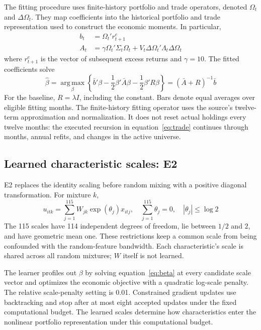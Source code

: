 \documentclass[12pt,letterpaper,fleqn]{article}
\newcommand{\argmax}{\operatorname*{arg\,max}}
\begin{document}
The fitting procedure uses finite-history portfolio and trade operators, denoted $\Omega_t$ and $\Delta\Omega_t$. They map coefficients into the historical portfolio and trade representation used to construct the economic moments. In particular,
\begin{align}
 b_t&=\Omega_t'r^e_{t+1}\\
 A_t&=\gamma\Omega_t'\Sigma_t\Omega_t
       +V_t\Delta\Omega_t'\Lambda_t\Delta\Omega_t\label{eq:moment}
\end{align}
where $r^e_{t+1}$ is the vector of subsequent excess returns and $\gamma=10$. The fitted coefficients solve
\begin{equation}\label{eq:beta}
 \widehat\beta=\argmax_\beta
 \left\{\bar b'\beta-\frac12\beta'\bar A\beta
                         -\frac12\beta'R\beta\right\}
       =(\bar A+R)^{-1}\bar b
\end{equation}
For the baseline, $R=\lambda I$, including the constant. Bars denote equal averages over eligible fitting months. The finite-history fitting operator uses the source's twelve-term approximation and normalization. It does not reset actual holdings every twelve months: the executed recursion in equation~\eqref{eq:trade} continues through months, annual refits, and changes in the active universe.

\subsection{Learned characteristic scales: E2}
E2 replaces the identity scaling before random mixing with a positive diagonal transformation. For mixture $k$,
\begin{equation}\label{eq:scale}
 u_{itk}=\sum_{j=1}^{115}W_{jk}\exp(\theta_j)x_{itj},\quad
 \sum_{j=1}^{115}\theta_j=0,\quad |\theta_j|\leq\log 2
\end{equation}
The 115 scales have 114 independent degrees of freedom, lie between $1/2$ and $2$, and have geometric mean one. These restrictions keep a common scale from being confounded with the random-feature bandwidth. Each characteristic's scale is shared across all random mixtures; $W$ itself is not learned.

The learner profiles out $\beta$ by solving equation~\eqref{eq:beta} at every candidate scale vector and optimizes the economic objective with a quadratic log-scale penalty. The relative scale-penalty setting is 0.01. Constrained gradient updates use backtracking and stop after at most eight accepted updates under the fixed computational budget. The learned scales determine how characteristics enter the nonlinear portfolio representation under this computational budget.
\end{document}
